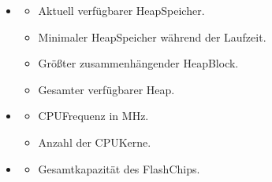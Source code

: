 \documentclass[letterpaper,10pt,english]{sphinxmanual}
\begin{document}
\sphinxAtStartPar
{}
\begin{itemize}
\item {} \begin{description}
\begin{itemize}
\item {} 
\sphinxAtStartPar
{}  \textendash{} Aktuell verfügbarer Heap\sphinxhyphen{}Speicher.

\item {} 
\sphinxAtStartPar
{}  \textendash{} Minimaler Heap\sphinxhyphen{}Speicher während der Laufzeit.

\item {} 
\sphinxAtStartPar
{}  \textendash{} Größter zusammenhängender Heap\sphinxhyphen{}Block.

\item {} 
\sphinxAtStartPar
{}  \textendash{} Gesamter verfügbarer Heap.

\end{itemize}

\end{description}

\item {} \begin{description}
\begin{itemize}
\item {} 
\sphinxAtStartPar
{}  \textendash{} CPU\sphinxhyphen{}Frequenz in MHz.

\item {} 
\sphinxAtStartPar
{}  \textendash{} Anzahl der CPU\sphinxhyphen{}Kerne.

\end{itemize}

\end{description}

\item {} \begin{description}
\begin{itemize}
\item {} 
\sphinxAtStartPar
{}  \textendash{} Gesamtkapazität des Flash\sphinxhyphen{}Chips.


\end{itemize}
\end{description}
\end{itemize}
\end{document}
